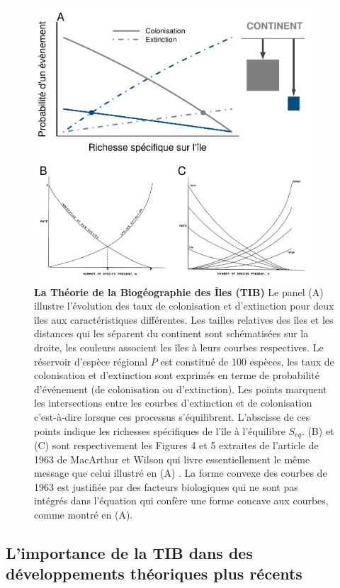 \begin{figure}[htbp]
\centering
\includegraphics[width=0.92000\textwidth]{fig/fig1.pdf}
\caption{\textbf{La Théorie de la Biogéographie des Îles (TIB)} Le panel
(A) illustre l'évolution des taux de colonisation et d'extinction pour
deux îles aux caractéristiques différentes. Les tailles relatives des
îles et les distances qui les séparent du continent sont schématisées
sur la droite, les couleurs associent les îles à leurs courbes
respectives. Le réservoir d'espèce régional \(P\) est constitué de 100
espèces, les taux de colonisation et d'extinction sont exprimés en terme
de probabilité d'événement (de colonisation ou d'extinction). Les points
marquent les intersections entre les courbes d'extinction et de
colonisation c'est-à-dire lorsque ces processus s'équilibrent.
L'abscisse de ces points indique les richesses spécifiques de l'île à
l'équilibre \(S_{eq}\). (B) et (C) sont respectivement les Figures 4 et
5 extraites de l'article de 1963 de MacArthur et Wilson qui livre
essentiellement le même message que celui illustré en (A)
\citep{MacArthur1963}. La forme convexe des courbes de 1963 est
justifiée par des facteurs biologiques qui ne sont pas intégrés dans
l'équation \label{eqMW} qui confère une forme concave aux courbes, comme
montré en (A).\label{fig:figMW}}
\end{figure}

\subsection*{L'importance de la TIB dans des développements théoriques
plus
récents}\label{limportance-de-la-tib-dans-des-duxe9veloppements-thuxe9oriques-plus-ruxe9cents}

